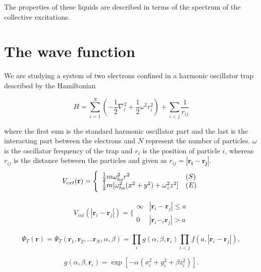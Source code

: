 The properties of these liquids are described in terms of the spectrum of the collective excitations.

\section{The wave function}
We are studying a system of two electrons confined in a harmonic oscillator trap described by the Hamiltonian 

\begin{equation}\label{eq:hamilt}
\hat{H} = \sum_{i=1}^N \left( - \frac{1}{2} \nabla_i^2 + \frac{1}{2} \omega^2 r_i^2 \right) + \sum_{i<j} \frac{1}{r_{ij}}
\end{equation}

where the first sum is the standard harmonic oscillator part and the last is the interacting part between the electrons and $N$ represent the number of particles. $\omega$ is the oscillator frequency of the trap and $r_i$ is the position of particle $i$, whereas $r_{ij}$ is the distance between the particles and given as $r_{ij} = |\mathbf{r_i} - \mathbf{r_j}|$. \\

\begin{equation} \label{eq:trap_potential}
 V_{ext}(\mathbf{r}) = 
 \Bigg\{
 \begin{array}{ll}
	 \frac{1}{2}m\omega_{ho}^2r^2 & (S)\\
 \strut
	 \frac{1}{2}m[\omega_{ho}^2(x^2+y^2) + \omega_z^2z^2] & (E)
 \end{array}
\end{equation}

\begin{equation} \label{eq:potential_internal}
 V_{int}(|\mathbf{r}_i-\mathbf{r}_j|) =  \Bigg\{
 \begin{array}{ll}
	 \infty & {|\mathbf{r}_i-\mathbf{r}_j|} \leq {a}\\
	 0 & {|\mathbf{r}_i-_r\mathbf{r}_j|} > {a}
 \end{array}
\end{equation}

\begin{equation} \label{eq:trialwf}
 \Psi_T(\mathbf{r})=\Psi_T(\mathbf{r}_1, \mathbf{r}_2, \dots \mathbf{r}_N,\alpha,\beta)=\prod_i g(\alpha,\beta,\mathbf{r}_i)\prod_{i < j}f(a,|\mathbf{r}_i-\mathbf{r}_j|),
\end{equation}

\begin{equation} \label{eq:spf_g}
g(\alpha,\beta,\mathbf{r}_i)= \exp{[-\alpha(x_i^2+y_i^2+\beta z_i^2)]}.
\end{equation}

